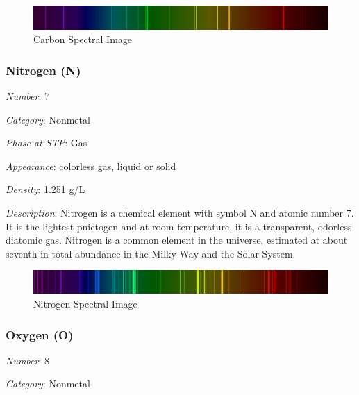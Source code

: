 \documentclass{article}
\begin{document}
\immediate{}
\begin{figure}[!ht]
    \centering
    \includegraphics[width=12cm]{./resources/spectral_img/Carbon_Spectra.jpg}
    \caption{Carbon Spectral Image}
\end{figure}

\hypertarget{subsubsection::N}{}\subsubsection{Nitrogen (N)}

\textit{Number}: 7

\textit{Category}: Nonmetal

\textit{Phase at STP}: Gas

\textit{Appearance}: colorless gas, liquid or solid

\textit{Density}: 1.251 g/L

\textit{Description}: Nitrogen is a chemical element with symbol N and atomic number 7. It is the lightest pnictogen and at room temperature, it is a transparent, odorless diatomic gas. Nitrogen is a common element in the universe, estimated at about seventh in total abundance in the Milky Way and the Solar System.

\immediate{}
\begin{figure}[!ht]
    \centering
    \includegraphics[width=12cm]{./resources/spectral_img/Nitrogen_Spectra.jpg}
    \caption{Nitrogen Spectral Image}
\end{figure}

\hypertarget{subsubsection::O}{}\subsubsection{Oxygen (O)}

\textit{Number}: 8

\textit{Category}: Nonmetal
\end{document}
